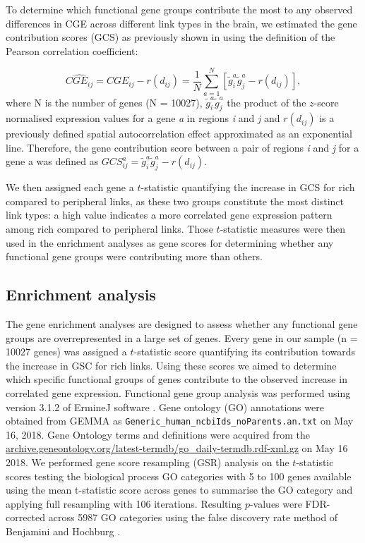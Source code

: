 To determine which functional gene groups contribute the most to any observed differences in CGE across different link types in the brain, we estimated the gene contribution scores (GCS) as previously shown in \citep{Fulcher2016} using the definition of the Pearson correlation coefficient:

\begin{equation}
    \label{eqn:Ch5Eq5}
    \widehat{CGE_{ij}} = CGE_{ij} - r(d_{ij}) = \frac{1}{N}\sum_{a=1}^{N}[\widetilde{g}_{i}^{a}\widetilde{g}_{j}^{a} - r(d_{ij})],
\end{equation}
where N is the number of genes (N = \num{10 027}), $\widetilde{g}_{i}^{a} \widetilde{g}_{j}^{a}$ the product of the $z$-score normalised expression values for a gene \textit{a} in regions \textit{i} and \textit{j} and $r(d_{ij})$ is a previously defined spatial autocorrelation effect approximated as an exponential line. Therefore, the gene contribution score between a pair of regions \textit{i} and \textit{j} for a gene a was defined as $GCS_{ij}^{a}= \widetilde{g}_{i}^{a}\widetilde{g}_{j}^{a} - r(d_{ij})$.

We then assigned each gene a $t$-statistic quantifying the increase in GCS for rich compared to peripheral links, as these two groups constitute the most distinct link types: a high value indicates a more correlated gene expression pattern among rich compared to peripheral links. Those $t$-statistic measures were then used in the enrichment analyses as gene scores for determining whether any functional gene groups were contributing more than others.

\subsection{Enrichment analysis}
\label{sec:enrichment}
The gene enrichment analyses are designed to assess whether any functional gene groups are overrepresented in a large set of genes. Every gene in our sample (n = \num{10027} genes) was assigned a $t$-statistic score quantifying its contribution towards the increase in GSC for rich links. Using these scores we aimed to determine which specific functional groups of genes contribute to the observed increase in correlated gene expression. Functional gene group analysis was performed using version 3.1.2 of ErmineJ software \citep{Gillis2010}. Gene ontology (GO) \citep{Ashburner2000} annotations were obtained from GEMMA \citep{Zoubarev2012} as \texttt{Generic\_human\_ncbiIds\_noParents.an.txt} on May 16, 2018. Gene Ontology terms and definitions were acquired from the \url{archive.geneontology.org/latest-termdb/go_daily-termdb.rdf-xml.gz} on May 16 2018. We performed gene score resampling (GSR) analysis on the $t$-statistic scores testing the biological process GO categories with 5 to 100 genes available using the mean t-statistic score across genes to summarise the GO category and applying full resampling with 106 iterations. Resulting $p$-values were FDR-corrected across \num{5987} GO categories using the false discovery rate method of Benjamini and Hochburg \citep{Benjamini1995}.

